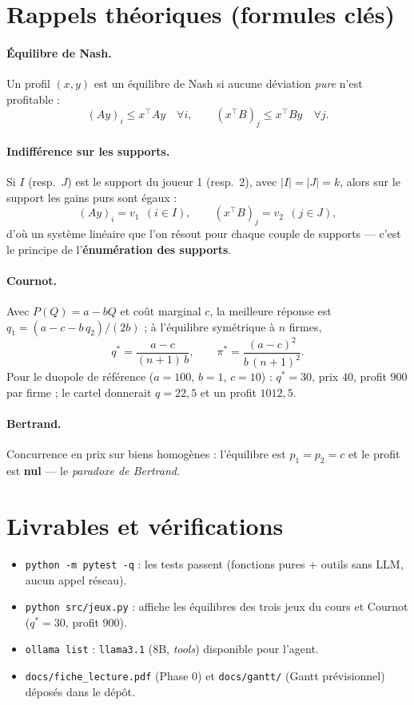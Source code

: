 \documentclass[11pt,a4paper]{article}
\begin{document}
\section{Rappels théoriques (formules clés)}

\paragraph{Équilibre de Nash.} Un profil $(x, y)$ est un équilibre de Nash si aucune déviation
\emph{pure} n'est profitable :
\[
(Ay)_i \le x^{\top} A y \quad \forall i, \qquad (x^{\top} B)_j \le x^{\top} B y \quad \forall j .
\]

\paragraph{Indifférence sur les supports.} Si $I$ (resp.\ $J$) est le support du joueur 1
(resp.\ 2), avec $|I| = |J| = k$, alors sur le support les gains purs sont égaux :
\[
(Ay)_i = v_1 \ \ (i \in I), \qquad (x^{\top} B)_j = v_2 \ \ (j \in J),
\]
d'où un système linéaire que l'on résout pour chaque couple de supports --- c'est le principe
de l'\textbf{énumération des supports}.

\paragraph{Cournot.} Avec $P(Q) = a - bQ$ et coût marginal $c$, la meilleure réponse est
$q_1 = (a - c - b\,q_2)/(2b)$ ; à l'équilibre symétrique à $n$ firmes,
\[
q^{*} = \frac{a - c}{(n+1)\,b}, \qquad \pi^{*} = \frac{(a-c)^2}{b\,(n+1)^2}.
\]
Pour le duopole de référence ($a = 100$, $b = 1$, $c = 10$) : $q^{*} = 30$, prix $40$,
profit $900$ par firme ; le cartel donnerait $q = 22{,}5$ et un profit $1012{,}5$.

\paragraph{Bertrand.} Concurrence en prix sur biens homogènes : l'équilibre est
$p_1 = p_2 = c$ et le profit est \textbf{nul} --- le \emph{paradoxe de Bertrand}.

\section{Livrables et vérifications}

\begin{itemize}
  \item \texttt{python -m pytest -q} : les tests passent (fonctions pures + outils sans LLM,
  aucun appel réseau).
  \item \texttt{python src/jeux.py} : affiche les équilibres des trois jeux du cours et
  Cournot ($q^{*} = 30$, profit $900$).
  \item \texttt{ollama list} : \texttt{llama3.1} (8B, \emph{tools}) disponible pour l'agent.
  \item \texttt{docs/fiche\_lecture.pdf} (Phase 0) et \texttt{docs/gantt/} (Gantt prévisionnel)
  déposés dans le dépôt.
\end{itemize}
\end{document}
